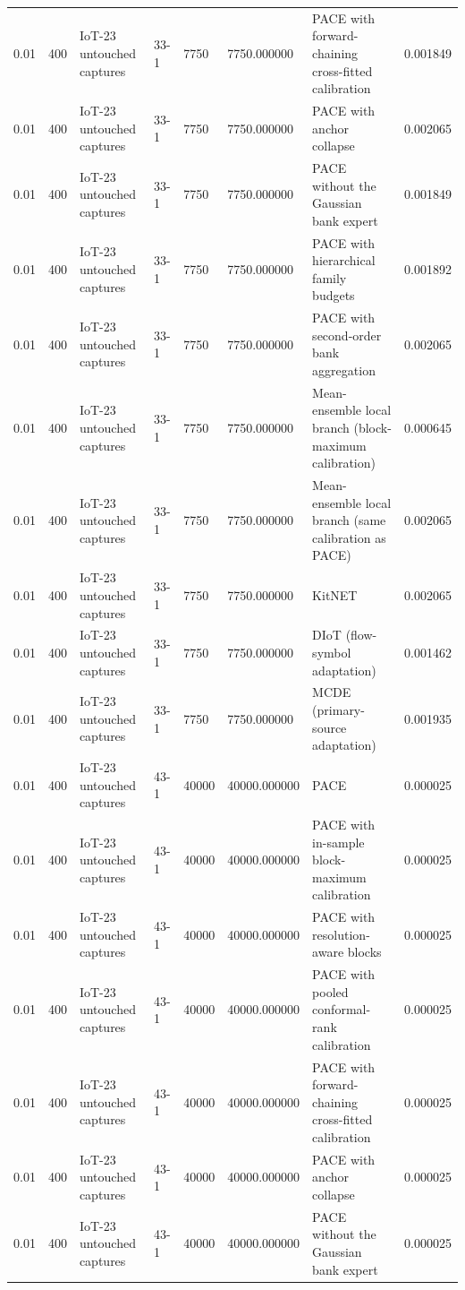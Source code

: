 \begin{tabular}{llllllll}
0.01 & 400 & IoT-23 untouched captures & 33-1 & 7750 & 7750.000000 & PACE with forward-chaining cross-fitted calibration & 0.001849 \\
0.01 & 400 & IoT-23 untouched captures & 33-1 & 7750 & 7750.000000 & PACE with anchor collapse & 0.002065 \\
0.01 & 400 & IoT-23 untouched captures & 33-1 & 7750 & 7750.000000 & PACE without the Gaussian bank expert & 0.001849 \\
0.01 & 400 & IoT-23 untouched captures & 33-1 & 7750 & 7750.000000 & PACE with hierarchical family budgets & 0.001892 \\
0.01 & 400 & IoT-23 untouched captures & 33-1 & 7750 & 7750.000000 & PACE with second-order bank aggregation & 0.002065 \\
0.01 & 400 & IoT-23 untouched captures & 33-1 & 7750 & 7750.000000 & Mean-ensemble local branch (block-maximum calibration) & 0.000645 \\
0.01 & 400 & IoT-23 untouched captures & 33-1 & 7750 & 7750.000000 & Mean-ensemble local branch (same calibration as PACE) & 0.002065 \\
0.01 & 400 & IoT-23 untouched captures & 33-1 & 7750 & 7750.000000 & KitNET & 0.002065 \\
0.01 & 400 & IoT-23 untouched captures & 33-1 & 7750 & 7750.000000 & DIoT (flow-symbol adaptation) & 0.001462 \\
0.01 & 400 & IoT-23 untouched captures & 33-1 & 7750 & 7750.000000 & MCDE (primary-source adaptation) & 0.001935 \\
0.01 & 400 & IoT-23 untouched captures & 43-1 & 40000 & 40000.000000 & PACE & 0.000025 \\
0.01 & 400 & IoT-23 untouched captures & 43-1 & 40000 & 40000.000000 & PACE with in-sample block-maximum calibration & 0.000025 \\
0.01 & 400 & IoT-23 untouched captures & 43-1 & 40000 & 40000.000000 & PACE with resolution-aware blocks & 0.000025 \\
0.01 & 400 & IoT-23 untouched captures & 43-1 & 40000 & 40000.000000 & PACE with pooled conformal-rank calibration & 0.000025 \\
0.01 & 400 & IoT-23 untouched captures & 43-1 & 40000 & 40000.000000 & PACE with forward-chaining cross-fitted calibration & 0.000025 \\
0.01 & 400 & IoT-23 untouched captures & 43-1 & 40000 & 40000.000000 & PACE with anchor collapse & 0.000025 \\
0.01 & 400 & IoT-23 untouched captures & 43-1 & 40000 & 40000.000000 & PACE without the Gaussian bank expert & 0.000025 \\

\end{tabular}
